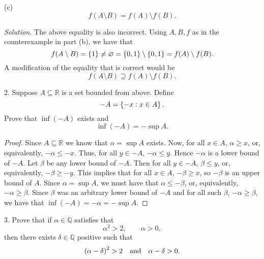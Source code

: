 \documentclass{article}
\newcommand{\Q}{\mathbb{Q}}
\newcommand{\R}{\mathbb{R}}
\begin{document}
\vspace{3mm}

(c)
%
\begin{equation*}
    f(A \setminus B) = f(A) \setminus f(B)
    .
\end{equation*}

\textit{Solution.} The above equality is also incorrect. Using $A, B, f$
as in the counterexample in part (b), we have that
%
\begin{equation*}
    f(A \setminus B)
        = \cbr{1}
        \neq \varnothing
        = \cbr{0, 1} \setminus \cbr{0, 1}
        = f(A) \setminus f(B)
    .
\end{equation*}
%
A modification of the equality that is correct would be
%
\begin{equation*}
    f(A \setminus B) \supseteq f(A) \setminus f(B)
    .
\end{equation*}

\newpage

2. Suppose $A \subseteq \R$ is a set bounded from above. Define
%
\begin{equation*}
   -A = \cbr{-x : x \in A}
   .
\end{equation*}
%
Prove that $\inf(-A)$ exists and
%
\begin{equation*}
    \inf(-A) = -\sup A
    .
\end{equation*}

\begin{proof}

Since $A \subseteq \R$ we know that $\alpha = \sup A$ exists. Now, for
all $x \in A$, $\alpha \geq x$, or, equivalently, $-\alpha \leq -x$.
Thus, for all $y \in -A$, $-\alpha \leq y$. Hence $-\alpha$ is a lower
bound of $-A$. Let $\beta$ be any lower bound of $-A$. Then for all $y
\in -A$, $\beta \leq y$, or, equivalently, $-\beta \geq -y$. This
implies that for all $x \in A$, $-\beta \geq x$, so $-\beta$ is an upper
bound of $A$. Since $\alpha = \sup A$, we must have that $\alpha \leq
-\beta$, or, equivalently, $-\alpha \geq \beta$. Since $\beta$ was an
arbitrary lower bound of $-A$ and for all such $\beta$, $-\alpha \geq
\beta$, we have that $\inf(-A) = -\alpha = - \sup A$.

\end{proof}

\newpage

3. Prove that if $\alpha \in \Q$ satisfies that
%
\begin{equation}
    \alpha^2 > 2, \qquad \alpha > 0
    ,
    \label{eq:q3-1}
\end{equation}
%
then there exists $\delta \in \Q$ positive such that
%
\begin{equation}
    \del{\alpha - \delta}^2 > 2
    \quad \text{and} \quad \alpha - \delta > 0
    .
    \label{eq:q3-2}
\end{equation}
\end{document}
